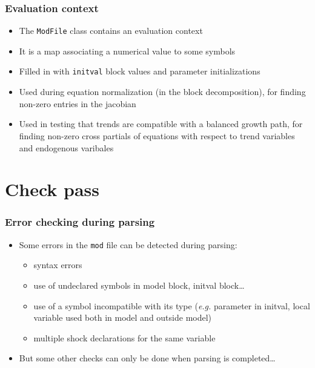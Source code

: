 \documentclass{beamer}
\begin{document}
\begin{frame}
  \frametitle{Evaluation context}
  \begin{itemize}
  \item The \texttt{ModFile} class contains an \alert{evaluation context}
  \item It is a map associating a numerical value to some symbols
  \item Filled in with \texttt{initval} block values and parameter initializations
  \item Used during equation normalization (in the block decomposition), for finding non-zero entries in the jacobian
  \item Used in testing that trends are compatible with a balanced growth path, for finding non-zero cross partials of equations with respect to trend variables and endogenous varibales
  \end{itemize}
\end{frame}

\section{Check pass}

\begin{frame}
  \frametitle{Error checking during parsing}
  \begin{itemize}
  \item Some errors in the \texttt{mod} file can be detected during parsing:
    \begin{itemize}
    \item syntax errors
    \item use of undeclared symbols in model block, initval block\ldots
    \item use of a symbol incompatible with its type (\textit{e.g.} parameter in initval, local variable used both in model and outside model)
    \item multiple shock declarations for the same variable
    \end{itemize}
  \item But some other checks can only be done when parsing is completed\ldots
  \end{itemize}
\end{frame}
\end{document}
